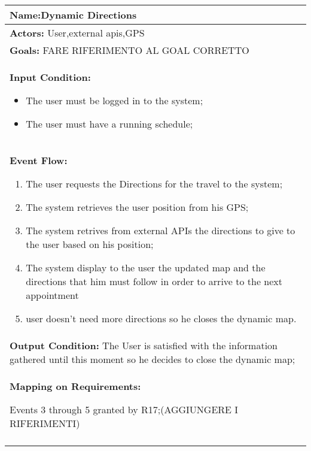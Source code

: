\begin{longtable}{|p{14cm}|} \hline

\textbf{Name:}Dynamic Directions\\ \hline

\textbf{Actors:} User,external apis,GPS \\ \hline

\textbf{Goals:} FARE RIFERIMENTO AL GOAL CORRETTO \\ \hline

\textbf{Input Condition:}

\begin{itemize}
\item The user must be logged in to the system;
\item The user must have a running schedule;
\end{itemize}
 \\ \hline

\textbf{Event Flow:}

\begin{enumerate}
\item The user requests the Directions for the travel to the system;
\item The system retrieves the user position from his GPS;
\item The system retrives from external APIs the directions to give to the user based on his position;
\item The system display to the user the updated map and the directions that him must follow in order to arrive to the next appointment
\item user doesn't need more directions so he closes the dynamic map.
\end{enumerate}	\\ \hline

\textbf{Output Condition:} The User is satisfied with the information gathered until this moment so he decides to close the dynamic map; \\ \hline

%

\textbf{Mapping on Requirements:}

Events 3 through 5 granted by R17;(AGGIUNGERE I RIFERIMENTI) \\\\ \hline

\end{longtable}

